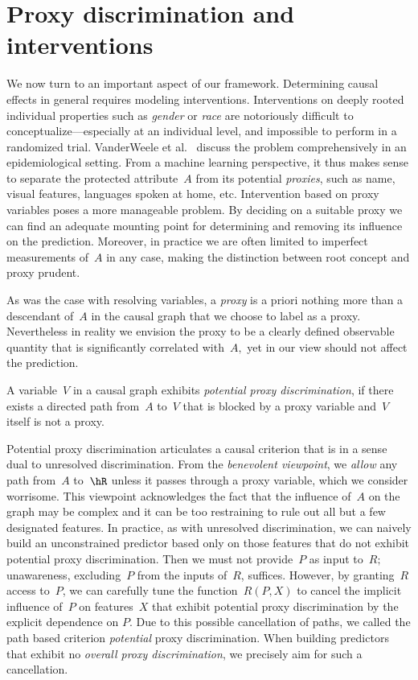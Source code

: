 \section{Proxy discrimination and interventions}
\label{sec:proxies}

We now turn to an important aspect of our framework. Determining causal effects
in general requires modeling interventions. Interventions on deeply rooted
individual properties such as \emph{gender} or \emph{race} are notoriously
difficult to conceptualize---especially at an individual level, and impossible
to perform in a randomized trial. VanderWeele et al.~\cite{VanderWeele2014}
discuss the problem comprehensively in an epidemiological setting. From a
machine learning perspective, it thus makes sense to separate the protected
attribute~$A$ from its potential \emph{proxies}, such as name, visual features,
languages spoken at home, etc. Intervention based on proxy variables poses a
more manageable problem. By deciding on a suitable proxy we can find an adequate
mounting point for determining and removing its influence on the prediction.
Moreover, in practice we are often limited to imperfect measurements of~$A$ in
any case, making the distinction between root concept and proxy prudent.

As was the case with resolving variables, a \emph{proxy} is a priori nothing
more than a descendant of~$A$ in the causal graph that we choose to label as a
proxy. Nevertheless in reality we envision the proxy to be a clearly defined
observable quantity that is significantly correlated with~$A,$ yet in our view
should not affect the prediction.

\begin{definition}\label{def:proxy}
  A variable~$V$ in a causal graph exhibits \emph{potential proxy
  discrimination}, if there exists a directed path from~$A$ to~$V$ that is
  blocked by a proxy variable and~$V$ itself is not a proxy.
\end{definition}

Potential proxy discrimination articulates a causal criterion that is in a sense
dual to unresolved discrimination. From the \emph{benevolent viewpoint}, we \emph{allow} any path from~$A$
to~$\hR$ unless it passes through a proxy variable, which we consider worrisome.
This viewpoint acknowledges the fact that the influence of~$A$ on the graph may
be complex and it can be too restraining to rule out all but a few designated
features. In practice, as with unresolved discrimination, we can naively build
an unconstrained predictor based only on those features that do not exhibit
potential proxy discrimination. Then we must not provide~$P$ as input to~$R;$
unawareness, \ie{} excluding~$P$ from the inputs of~$R$, suffices. However, by
granting~$R$ access to~$P$, we can carefully tune the function~$R(P, X)$ to
cancel the implicit influence of~$P$ on features~$X$ that exhibit potential
proxy discrimination by the explicit dependence on $P$. Due to this possible
cancellation of paths, we called the path based criterion \emph{potential} proxy
discrimination. When building predictors that exhibit no \emph{overall proxy
discrimination}, we precisely aim for such a cancellation.

